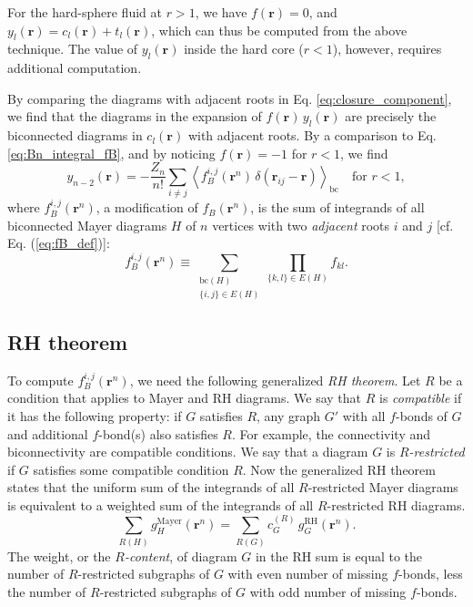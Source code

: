 \documentclass[aip,jcp,preprint,superscriptaddress,showpacs,preprintnumbers,amsmath,amssymb]{revtex4-1}
\numberwithin{equation}{section}
\newcommand{\vct}[1]{\mathbf{#1}}
\providecommand{\vr}{} %
\renewcommand{\vr}{\vct{r}}
\begin{document}
For the hard-sphere fluid at $r > 1$,
we have $f(\vr) = 0$,
and $y_l(\vr) = c_l(\vr) + t_l(\vr)$,
which can thus be computed from the above technique.
%
The value of $y_l(\vr)$ inside the hard core ($r < 1$),
however, requires additional computation.



By comparing the diagrams with adjacent roots
in Eq. \eqref{eq:closure_component},
we find that the diagrams in the expansion of
$f(\vr) \, y_l(\vr)$ are precisely
the biconnected diagrams in $c_l(\vr)$
with adjacent roots.
%
By a comparison to Eq. \eqref{eq:Bn_integral_fB},
and by noticing $f(\vr) = -1$ for $r < 1$,
we find
%
%
%
\[
y_{n-2}(\vr)
=
-\frac{Z_n}{n!}
\sum_{i \ne j}
\left\langle
  f_B^{i,j}(\vr^n) \, \delta(\vr_{ij} - \vr)
\right\rangle_\mathrm{bc}
\quad
\mbox{for $r < 1$},
\]
%
%
%
where $f_B^{i,j}(\vr^n)$,
a modification of $f_B(\vr^n)$,
is the sum of integrands of all biconnected Mayer diagrams $H$
of $n$ vertices with two \emph{adjacent}
roots $i$ and $j$ [cf. Eq. (\eqref{eq:fB_def})]:
%
%
%
\begin{equation}
f_B^{i,j}(\vr^n)
\equiv
\sum_{ \substack{
          \mathrm{bc}(H) \\
          \{i,j\}\in E(H) } }
\prod_{ \{k,l\} \in E(H) }
f_{kl}.
\label{eq:fBij_def}
\end{equation}
%
%
%





\subsection{\label{sec:RH_theorem}RH theorem}




To compute $f_B^{i,j}(\vr^n)$,
we need the following generalized
\emph{RH theorem}.
%
Let $R$ be a condition that applies to Mayer and RH diagrams.
%
We say that $R$ is \emph{compatible}
if it has the following property:
if $G$ satisfies $R$,
any graph $G'$ with all $f$-bonds of $G$
and additional $f$-bond(s)
also satisfies $R$.
%
For example,
the connectivity and biconnectivity
are compatible conditions.
%
We say that a diagram $G$ is \emph{$R$-restricted}
if $G$ satisfies some compatible condition $R$.
%
Now the generalized RH theorem states that
the uniform sum of the integrands of
all $R$-restricted Mayer diagrams
is equivalent to a weighted sum of the integrands of
all $R$-restricted RH diagrams.
%
%
%
\[
\sum_{ R(H) }
g_H^\mathrm{Mayer}(\vr^n)
=
\sum_{ R(G) }
c_G^{(R)} \,
g_G^\mathrm{RH}(\vr^n).
\]
%
%
%
The weight, or the \emph{$R$-content},
of diagram $G$ in the RH sum is equal to
the number of $R$-restricted subgraphs of $G$
with even number of missing $f$-bonds,
less the number of $R$-restricted subgraphs of $G$
with odd number of missing $f$-bonds.
\end{document}
